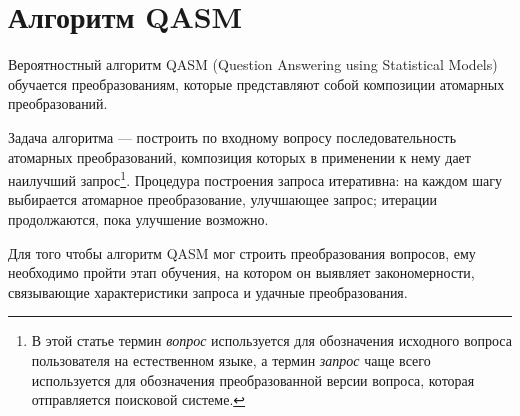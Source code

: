 \documentclass{article}
\begin{document}

\section{Алгоритм QASM}



Вероятностный алгоритм QASM (Question Answering using Statistical Models)~\cite{qa:radev:qasm}
обучается  преобразованиям, которые представляют собой композиции атомарных
преобразований. 

Задача алгоритма --- построить по входному вопросу последовательность
атомарных преобразований, композиция которых в применении к нему дает
наилучший запрос\footnote{В этой статье термин {\em вопрос}
используется для обозначения исходного вопроса пользователя на естественном
языке, а термин {\em запрос} чаще всего используется для обозначения
преобразованной версии вопроса,
которая отправляется поисковой системе.}.
Процедура построения запроса итеративна: на каждом шагу
выбирается атомарное преобразование, улучшающее запрос; итерации
продолжаются, пока улучшение возможно.

Для того чтобы алгоритм QASM мог строить преобразования вопросов,
ему необходимо пройти этап обучения,
на котором  он выявляет закономерности,
связывающие характеристики запроса и удачные преобразования.

\end{document}
